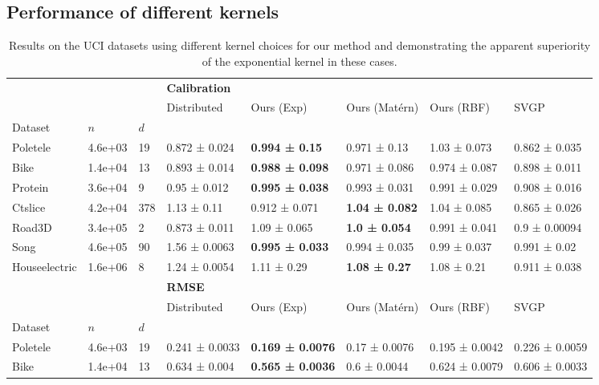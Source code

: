 \subsection{Performance of different kernels}
\begin{table}[ht]\scriptsize
\setlength{\tabcolsep}{5pt} %
\caption{Results on the UCI datasets using different kernel choices for our method and demonstrating the apparent superiority of the exponential kernel in these cases.}
\label{tab:best_kernels}
\begin{tabularx}{\textwidth}{llllllll}
\toprule
 &  &  & \multicolumn{5}{l}{\textbf{Calibration}} \\
 &  &  & Distributed & Ours (Exp) & Ours (Matérn) & Ours (RBF) & SVGP \\
Dataset & \(n\) & \(d\) &  &  &  &  &  \\
\midrule
Poletele & 4.6e+03 & 19 & 0.872 ± 0.024 & \bfseries 0.994 ± 0.15 & 0.971 ± 0.13 & 1.03 ± 0.073 & 0.862 ± 0.035 \\
Bike & 1.4e+04 & 13 & 0.893 ± 0.014 & \bfseries 0.988 ± 0.098 & 0.971 ± 0.086 & 0.974 ± 0.087 & 0.898 ± 0.011 \\
Protein & 3.6e+04 & 9 & 0.95 ± 0.012 & \bfseries 0.995 ± 0.038 & 0.993 ± 0.031 & 0.991 ± 0.029 & 0.908 ± 0.016 \\
Ctslice & 4.2e+04 & 378 & 1.13 ± 0.11 & 0.912 ± 0.071 & \bfseries 1.04 ± 0.082 & 1.04 ± 0.085 & 0.865 ± 0.026 \\
Road3D & 3.4e+05 & 2 & 0.873 ± 0.011 & 1.09 ± 0.065 & \bfseries 1.0 ± 0.054 & 0.991 ± 0.041 & 0.9 ± 0.00094 \\
Song & 4.6e+05 & 90 & 1.56 ± 0.0063 & \bfseries 0.995 ± 0.033 & 0.994 ± 0.035 & 0.99 ± 0.037 & 0.991 ± 0.02 \\
Houseelectric & 1.6e+06 & 8 & 1.24 ± 0.0054 & 1.11 ± 0.29 & \bfseries 1.08 ± 0.27 & 1.08 ± 0.21 & 0.911 ± 0.038 \\
\bottomrule
\toprule
 &  &  & \multicolumn{5}{l}{\textbf{RMSE}} \\
 &  &  & Distributed & Ours (Exp) & Ours (Matérn) & Ours (RBF) & SVGP \\
Dataset & \(n\) & \(d\) &  &  &  &  &  \\
\midrule
Poletele & 4.6e+03 & 19 & 0.241 ± 0.0033 & \bfseries 0.169 ± 0.0076 & 0.17 ± 0.0076 & 0.195 ± 0.0042 & 0.226 ± 0.0059 \\
Bike & 1.4e+04 & 13 & 0.634 ± 0.004 & \bfseries 0.565 ± 0.0036 & 0.6 ± 0.0044 & 0.624 ± 0.0079 & 0.606 ± 0.0033 \\

\end{tabularx}
\end{table}
